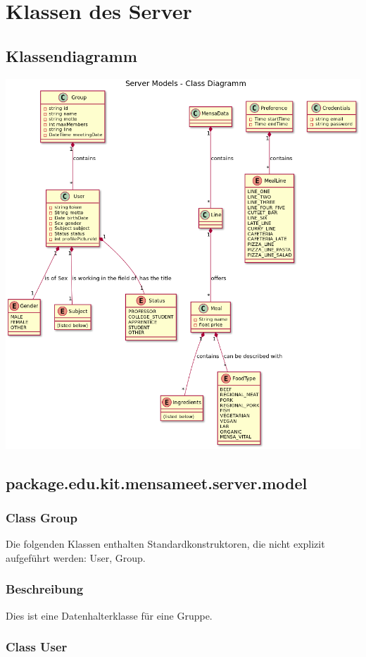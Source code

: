 \documentclass[a4paper]{scrreprt}
\begin{document}
\section{Klassen des Server}

\subsection{Klassendiagramm}
	\includegraphics[width=1\textwidth]{Klassendiagramme/serverModelsCD.png}
\newpage
\subsection{package.edu.kit.mensameet.server.model}
\subsubsection{Class Group}
Die folgenden Klassen enthalten Standardkonstruktoren, die nicht explizit aufgeführt werden: User, Group.
\subsubsection*{Beschreibung}
Dies ist eine Datenhalterklasse für eine Gruppe. 

\subsubsection{Class User}
\end{document}
